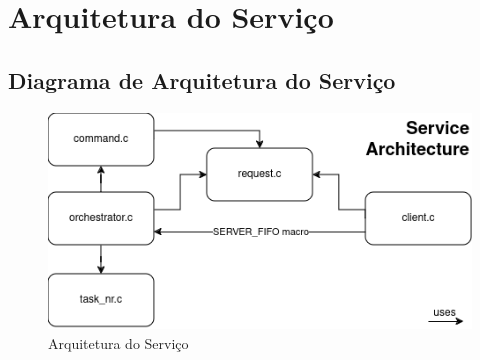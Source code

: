 \documentclass[a4paper,11pt]{scrreprt}
\begin{document}
\pagebreak



\renewcommand{\contentsname}{Índice}
\renewcommand{\listfigurename}{Índice de Figuras}
\renewcommand{\listtablename}{Índice de Tabelas}

\begin{minipage}{\textwidth}
\tableofcontents
\listoffigures
\listoftables
\end{minipage}




\chapter{Arquitetura do Serviço}
    \section{Diagrama de Arquitetura do Serviço}
        \begin{figure}[!ht]
            \centering
            \includegraphics[scale=0.7]{diagrams/architecture.png}
            \caption{\small Arquitetura do Serviço}
            \label{fig:1.1}
        \end{figure}
\end{document}
